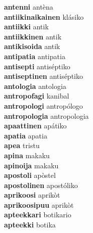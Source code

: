 \textbf{antenni } antèna \\
\textbf{antiikinaikainen } klásiko \\
\textbf{antiikki } antik \\
\textbf{antiikkinen } antik \\
\textbf{antikisoida } antik \\
\textbf{antipatia } antipatia \\
\textbf{antisepti } antiséptiko \\
\textbf{antiseptinen } antiséptiko \\
\textbf{antologia } antologia \\
\textbf{antropofagi } kanibal \\
\textbf{antropologi } antropólogo \\
\textbf{antropologia } antropologia \\
\textbf{apaattinen } apátiko \\
\textbf{apatia } apatia \\
\textbf{apea } tristu \\
\textbf{apina } makaku \\
\textbf{apinoija } makaku \\
\textbf{apostoli } apòstel \\
\textbf{apostolinen } apostóliko \\
\textbf{aprikoosi } aprikòt \\
\textbf{aprikoosipuu } aprikòt \\
\textbf{apteekkari } botikario \\
\textbf{apteekki } botika \\
